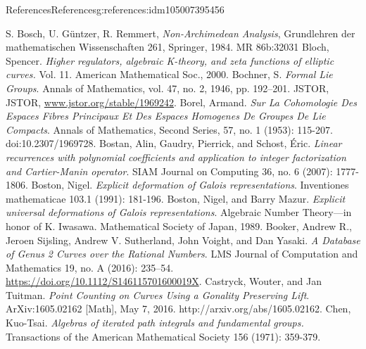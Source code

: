 \documentclass[oneside,10pt,]{book}
\numberwithin{equation}{section}
\begin{document}
\begin{references-chapter-numberless}{References}{}{References}{}{}{g:references:idm105007395456}
\begin{thebibliography}{9}
\hypertarget{x:biblio:bib-bgr}{}S. Bosch, U. Güntzer, R. Remmert, \textit{Non-Archimedean Analysis}, Grundlehren der mathematischen Wissenschaften 261, Springer, 1984. MR 86b:32031
\hypertarget{x:biblio:bib-bloch}{}Bloch, Spencer.  \textit{Higher regulators, algebraic K-theory, and zeta functions of elliptic curves.} Vol. 11. American Mathematical Soc., 2000.
\hypertarget{x:biblio:bib-bochner-formal}{}Bochner, S. \textit{Formal Lie Groups}. Annals of Mathematics, vol. 47, no. 2, 1946, pp. 192–201. JSTOR, JSTOR, \url{www.jstor.org/stable/1969242}.
\hypertarget{x:biblio:bib-borel-hopf}{}Borel, Armand. \textit{Sur La Cohomologie Des Espaces Fibres Principaux Et Des Espaces Homogenes De Groupes De Lie Compacts}. Annals of Mathematics, Second Series, 57, no. 1 (1953): 115-207. doi:10.2307\slash{}1969728.
\hypertarget{x:biblio:bib-bostan-gaudry-schost}{}Bostan, Alin, Gaudry, Pierrick, and Schost, Éric. \textit{Linear recurrences with polynomial coefficients and application to integer factorization and Cartier-Manin operator}. SIAM Journal on Computing 36, no. 6 (2007): 1777-1806.
\hypertarget{x:biblio:bib-boston-explicit}{}Boston, Nigel. \textit{Explicit deformation of Galois representations}. Inventiones mathematicae 103.1 (1991): 181-196.
\hypertarget{x:biblio:bib-boston-mazur}{}Boston, Nigel, and Barry Mazur. \textit{Explicit universal deformations of Galois representations}. Algebraic Number Theory—in honor of K. Iwasawa. Mathematical Society of Japan, 1989.
\hypertarget{x:biblio:bib-booker-database-genus-2}{}Booker, Andrew R., Jeroen Sijsling, Andrew V. Sutherland, John Voight, and Dan Yasaki. \textit{A Database of Genus 2 Curves over the Rational Numbers}. LMS Journal of Computation and Mathematics 19, no. A (2016): 235–54. \url{https://doi.org/10.1112/S146115701600019X}.
\hypertarget{x:biblio:bib-castryck-tuitman}{}Castryck, Wouter, and Jan Tuitman. \textit{Point Counting on Curves Using a Gonality Preserving Lift}. ArXiv:1605.02162 [Math], May 7, 2016. http:\slash{}\slash{}arxiv.org\slash{}abs\slash{}1605.02162.
\hypertarget{x:biblio:bib-chen}{}Chen, Kuo-Tsai.  \textit{Algebras of iterated path integrals and fundamental groups.} Transactions of the American Mathematical Society 156 (1971): 359-379.

\end{thebibliography}
\end{references-chapter-numberless}
\end{document}
